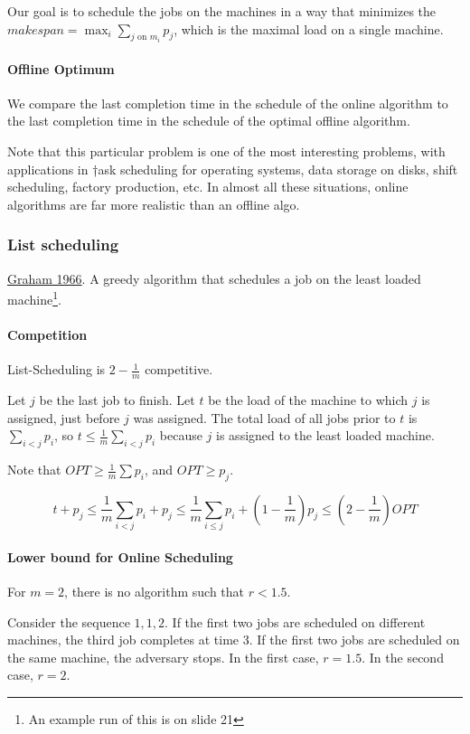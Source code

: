 \documentclass[a4paper]{article}
\begin{document}
Our goal is to schedule the jobs on the machines in a way that minimizes the $makespan=\max_i\sum_\text{$j$ on $m_i$}p_j$, which is the maximal load on a single machine.

\paragraph{Offline Optimum}
We compare the last completion time in the schedule of the online algorithm to the last completion time in the schedule of the optimal offline algorithm.

Note that this particular problem is one of the most interesting problems, with applications in †ask scheduling for operating systems, data storage on disks, shift scheduling, factory production, etc. In almost all these situations, online algorithms are far more realistic than an offline algo.

\subsubsection{List scheduling}
\href{http://www.math.ucsd.edu/~ronspubs/66_04_multiprocessing.pdf}{Graham 1966}.
A greedy algorithm that schedules a job on the least loaded machine\footnote{An example run of this is on slide 21}.

\paragraph{Competition}
List-Scheduling is $2-\frac{1}{m}$ competitive.

Let $j$ be the last job to finish.
Let $t$ be the load of the machine to which $j$ is assigned, just before $j$ was assigned.
The total load of all jobs prior to $t$ is $\sum_{i<j}p_i$, so $t \le \frac{1}{m} \sum_{i<j} p_i$ because $j$ is assigned to the least loaded machine.

Note that $OPT \ge \frac{1}{m} \sum p_i$, and $OPT \ge p_j$.

\[
t+p_j \le
\frac{1}{m} \sum_{i<j}p_i+p_j \le
\frac{1}{m} \sum_{i \le j} p_i + \left(1-\frac{1}{m}\right)p_j \le
\left(2-\frac{1}{m}\right)OPT
\]

\paragraph{Lower bound for Online Scheduling}
For $m=2$, there is no algorithm such that $r < 1.5$.

Consider the sequence $1,1,2$.
If the first two jobs are scheduled on different machines, the third job completes at time 3.
If the first two jobs are scheduled on the same machine, the adversary stops.
In the first case, $r=1.5$. In the second case, $r=2$.
\end{document}
